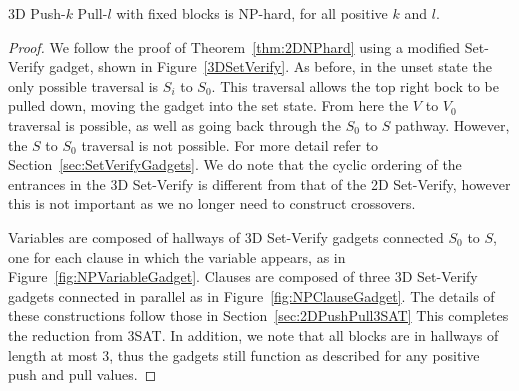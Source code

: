 \begin{theorem}
3D Push-$k$ Pull-$l$ with fixed blocks is NP-hard, for all positive $k$ and $l$.
\end{theorem}
\begin{proof}
We follow the proof of Theorem~\ref{thm:2DNPhard} using a modified Set-Verify gadget, shown in Figure~\ref{3DSetVerify}. As before, in the unset state the only possible traversal is $S_i$ to $S_0$. This traversal allows the top right bock to be pulled down, moving the gadget into the set state. From here the $V$ to $V_0$ traversal is possible, as well as going back through the $S_0$ to $S$ pathway. However, the $S$ to $S_0$ traversal is not possible. For more detail refer to Section~\ref{sec:SetVerifyGadgets}. We do note that the cyclic ordering of the entrances in the 3D Set-Verify is different from that of the 2D Set-Verify, however this is not important as we no longer need to construct crossovers.

Variables are composed of hallways of 3D Set-Verify gadgets connected $S_0$ to $S$, one for each clause in which the variable appears, as in Figure~\ref{fig:NPVariableGadget}. Clauses are composed of three 3D Set-Verify gadgets connected in parallel as in Figure~\ref{fig:NPClauseGadget}. The details of these constructions follow those in Section~\ref{sec:2DPushPull3SAT} This completes the reduction from 3SAT. In addition, we note that all blocks are in hallways of length at most 3, thus the gadgets still function as described for any positive push and pull values.
\end{proof}




